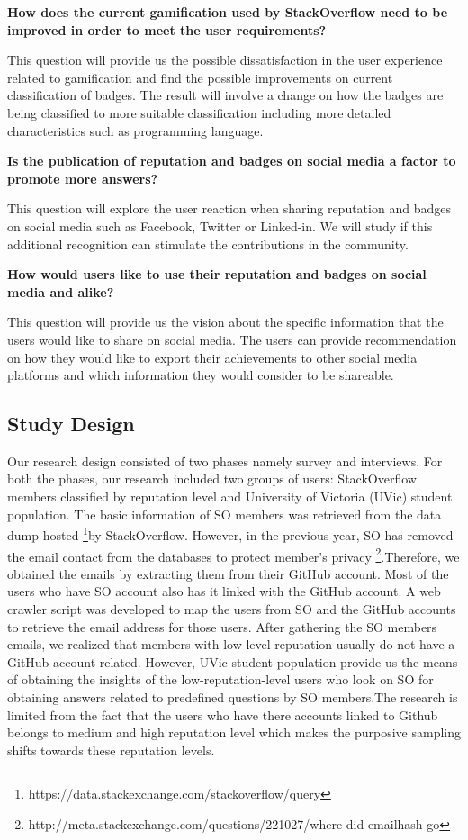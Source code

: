 \documentclass{sigchi}
\begin{document}
\textbf{How does the current gamification used by StackOverflow need to be improved in order to meet the user requirements?}

This question will provide us the possible dissatisfaction in the user experience related to gamification and find the possible improvements on current classification of badges. The result will involve a change on how the badges are being classified to more suitable classification including more detailed characteristics such as programming language.

\textbf{Is the publication of reputation and badges on social media a
factor to promote more answers?}

This question will explore the user reaction when sharing reputation and badges on social media such as Facebook, Twitter or Linked-in. We will study if this additional recognition can stimulate the contributions in the community.

\textbf{How would users like to use their reputation and badges
on social media and alike?}

This question will provide us the vision about the specific information that the users would like to share on social media. The users can provide recommendation on how they would like to export their achievements to other social media platforms and which information they would consider to be shareable.

\subsection{Study Design}
Our research design consisted of two phases namely survey and interviews. For both the phases, our research included two groups of users: StackOverflow members classified by reputation level and University of Victoria (UVic) student population. The basic information of SO members was retrieved from the data dump hosted \footnote{https://data.stackexchange.com/stackoverflow/query}by StackOverflow. However, in the previous year, SO has removed the email contact from the databases to protect member's privacy \footnote{http://meta.stackexchange.com/questions/221027/where-did-emailhash-go}.Therefore, we obtained the emails by extracting them from their GitHub account. Most of the users who have SO account also has it linked with the GitHub account. A web crawler script was developed to map the users from SO and the GitHub accounts to retrieve the email address for those users. After gathering the SO members emails, we realized that members with low-level reputation usually do not have a GitHub account related. However, UVic student population provide us the means of obtaining the insights of the low-reputation-level users who look on SO for obtaining answers related to predefined questions by SO members.The research is limited from the fact that the users who have there accounts linked to Github belongs to medium and high reputation level which makes the purposive sampling shifts towards these reputation levels.
\end{document}
